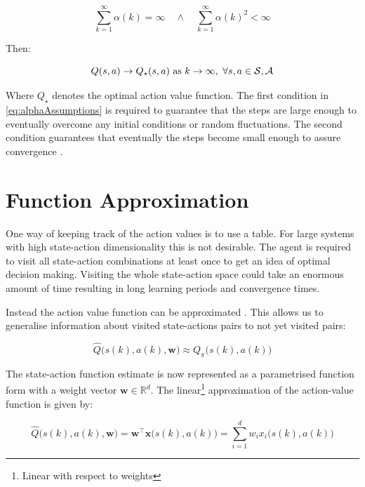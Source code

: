 \begin{equation}\label{eq:alphaAssumptions}
	\sum_{k=1}^{\infty}\alpha(k)=\infty \quad \wedge \quad \sum_{k=1}^{\infty}\alpha(k)^{2}<\infty
\end{equation} 

Then: 

\begin{equation}
	Q(s,a) \rightarrow Q_\star(s,a)\hspace{0.108cm} \text{as}\hspace{0.108cm}k \rightarrow\infty,\hspace{0.108cm} \forall s,a \in \mathcal{S,A}
\end{equation}

Where $ Q_{\star} $ denotes the optimal action value function. The first condition in \cref{eq:alphaAssumptions} is required to guarantee that the steps are large enough to eventually
overcome any initial conditions or random ﬂuctuations. The second condition guarantees
that eventually the steps become small enough to assure convergence \cite{Sutton2020}.

\section{Function Approximation}\label{sec:FuncApprox}
One way of keeping track of the action values is to use a table. For large systems with high state-action dimensionality this is not desirable. The agent is required to visit all state-action combinations at least once to get an idea of optimal decision making. Visiting the whole state-action space could take an enormous amount of time resulting in long learning periods and convergence times.

Instead the action value function can be approximated \cite{Sutton2020}. This allows us to generalise information about visited state-actions pairs to not yet visited pairs:

\begin{equation}\label{eq:QApprox1}
	\hat{Q}\bigg(s(k),a(k),\textbf{w}\bigg) \approx Q_{\pi}\bigg(s(k),a(k)\bigg)
\end{equation}

The state-action function estimate is now represented as a parametrised function form with a weight vector $ \textbf{w} \in \mathbb{R}^{d}$. The linear\footnote{Linear with respect to weights} approximation of the action-value function is given by:

\begin{equation}\label{eq:QApprox2}
	\hat{Q}\bigg(s(k),a(k),\textbf{w}\bigg)=\textbf{w}^{\intercal}\textbf{x}\bigg(s(k),a(k)\bigg)=\sum_{i=1}^{d}w_{i}x_{i}\bigg(s(k),a(k)\bigg)
\end{equation}

